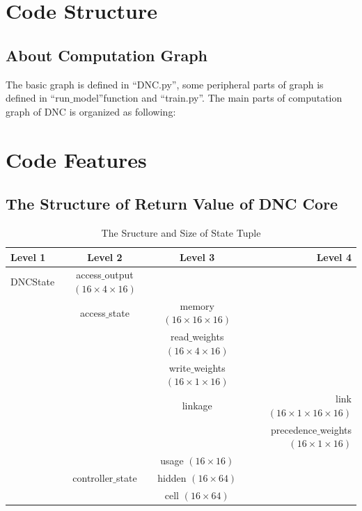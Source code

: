\documentclass{article}
\begin{document}
\section{Code Structure}
\subsection{About Computation Graph}
The basic graph is defined in ``DNC.py'', some peripheral parts of graph is defined in ``run$\_$model''function and ``train.py''. The main parts of computation graph of DNC is organized as following:
\section{Code Features}
\subsection{The Structure of Return Value of DNC Core}
\begin{table}[!htb]
\centering
\caption{The Sructure and Size of State Tuple}
\begin{tabular}{| l | c | c | r |} \hline
Level 1  & Level 2          & Level 3           & Level 4  \\ \hline
DNCState & access$\_$output $(16\times4\times16)$ &                   &   \\ \hline
         & access$\_$state  & memory $(16\times16\times16)$ &   \\ \hline
         &                  & read$\_$weights $(16\times4\times16)$ &   \\ \hline
         &                  & write$\_$weights $(16\times1\times16)$ &   \\ \hline
         &                  & linkage           & link $(16\times1\times16\times16)$ \\ \hline
         &                  &                   & precedence$\_$weights $(16\times1\times16)$ \\ \hline
         &                  & usage $(16\times16)$ & \\ \hline
         & controller$\_$state    & hidden $(16\times64)$ & \\ \hline
         &                  & cell $(16\times64)$ & \\ \hline
\end{tabular}
\label{tab:TupleStructureSize}
\end{table}
\end{document}
